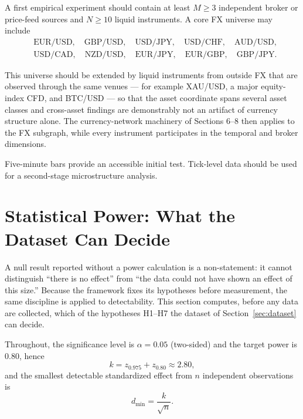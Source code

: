 \documentclass[11pt,a4paper]{article}
\numberwithin{equation}{section}
\begin{document}
A first empirical experiment should contain at least $M\geq3$
independent broker or price-feed sources and $N\geq10$ liquid
instruments. A core FX universe may include
\begin{align*}
&\mathrm{EUR/USD},\quad\mathrm{GBP/USD},\quad\mathrm{USD/JPY},\quad
\mathrm{USD/CHF},\quad\mathrm{AUD/USD},\\
&\mathrm{USD/CAD},\quad\mathrm{NZD/USD},\quad\mathrm{EUR/JPY},\quad
\mathrm{EUR/GBP},\quad\mathrm{GBP/JPY}.
\end{align*}

This universe should be extended by liquid instruments from outside
FX that are observed through the same venues --- for example
XAU/USD, a major equity-index CFD, and BTC/USD --- so that the asset
coordinate spans several asset classes and cross-asset findings are
demonstrably not an artifact of currency structure alone. The
currency-network machinery of Sections 6--8 then applies to the FX
subgraph, while every instrument participates in the temporal and
broker dimensions.

Five-minute bars provide an accessible initial test. Tick-level data
should be used for a second-stage microstructure analysis.

\section{Statistical Power: What the Dataset Can Decide}
\label{sec:power}

A null result reported without a power calculation is a
non-statement: it cannot distinguish ``there is no effect'' from
``the data could not have shown an effect of this size.'' Because
the framework fixes its hypotheses before measurement, the same
discipline is applied to detectability. This section computes,
before any data are collected, which of the hypotheses
H1--H7 the dataset of Section~\ref{sec:dataset} can decide.

Throughout, the significance level is $\alpha=0.05$ (two-sided) and
the target power is $0.80$, hence
\begin{equation}
k=z_{0.975}+z_{0.80}\approx2.80,
\end{equation}
and the smallest detectable standardized effect from $n$ independent
observations is
\begin{equation}
d_{\min}=\frac{k}{\sqrt{n}}.
\label{eq:dmin}
\end{equation}
\end{document}
